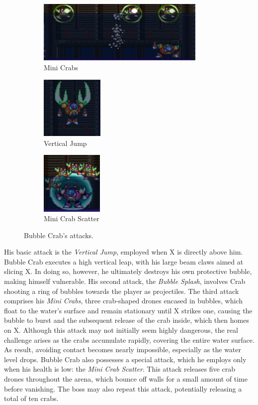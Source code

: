 \begin{figure}[htp]
	\ContinuedFloat
	\centering
	\begin{subfigure}{\linewidth}
		\centering
		\includegraphics[height=3cm]{figures/X2/Bubble_crab/Crab_minicrab.png}
		\caption{Mini Crabs}
	\end{subfigure}
	\begin{subfigure}{0.30\linewidth}
		\centering
		\includegraphics[height=3cm]{figures/X2/Bubble_crab/Crab_pinch.png}
		\caption{Vertical Jump}
	\end{subfigure}
	\begin{subfigure}{0.30\linewidth}
		\centering
		\includegraphics[height=3cm]{figures/X2/Bubble_crab/Crab_DM.png}
		\caption{Mini Crab Scatter}
	\end{subfigure}
	\caption{Bubble Crab's attacks.}	
\end{figure}
His basic attack is the \emph{Vertical Jump}, employed when X is directly above him. Bubble Crab executes a high vertical leap, with his large beam claws aimed at slicing X. In doing so, however, he ultimately destroys his own protective bubble, making himself vulnerable. His second attack, the \emph{Bubble Splash}, involves Crab shooting a ring of bubbles towards the player as projectiles. The third attack comprises his \emph{Mini Crabs}, three crab-shaped drones encased in bubbles, which float to the water's surface and remain stationary until X strikes one, causing the bubble to burst and the subsequent  release of the crab inside, which then homes on X. Although this attack may not initially seem highly dangerous, the real challenge arises as the crabs accumulate rapidly, covering the entire water surface. As result, avoiding contact becomes nearly impossible, especially as the water level drops.
Bubble Crab also possesses a special attack, which he employs only when his health is low: the \emph{Mini Crab Scatter}. This attack releases five crab drones throughout the arena, which bounce off walls for a small amount of time before vanishing. The boss may also repeat this attack, potentially releasing a total of ten crabs. 

